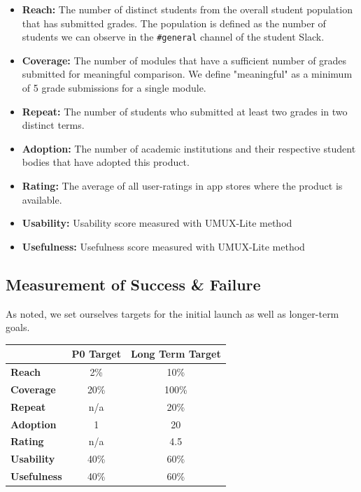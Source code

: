 \begin{itemize}
    \item \textbf{Reach:} The number of distinct students from the overall student population that has submitted grades. The population is defined as the number of students we can observe in the \texttt{\#general} channel of the student Slack. 
    \item \textbf{Coverage:} The number of modules that have a sufficient number of grades submitted for meaningful comparison. We define "meaningful" as a minimum of 5 grade submissions for a single module.
    \item \textbf{Repeat:} The number of students who submitted at least two grades in two distinct terms.
    \item \textbf{Adoption:} The number of academic institutions and their respective student bodies that have adopted this product.
   \item \textbf{Rating:} The average of all user-ratings in app stores where the product is available.
   \item \textbf{Usability:} Usability score measured with UMUX-Lite method
   \item \textbf{Usefulness:} Usefulness score measured with UMUX-Lite method
\end{itemize}

\subsection{Measurement of Success \& Failure}
As noted, we set ourselves targets for the initial launch as well as longer-term goals.

\begin{table}[H]
\centering
\begin{tabular}{@{}lcc@{}}
\toprule
                  & \multicolumn{1}{l}{\textbf{P0 Target}} & \multicolumn{1}{l}{\textbf{Long Term Target}} \\ \midrule
\textbf{Reach}    & 2\%                                   & 10\%                                         \\
\textbf{Coverage} & 20\%                                  & 100\%                                        \\
\textbf{Repeat}   & n/a                                   & 20\%                                         \\
\textbf{Adoption} & 1                                     & 20                                           \\
\textbf{Rating}   & n/a                                   & 4.5                                          \\ 
\textbf{Usability}   & 40\%                                   & 60\%                                          \\ 
\textbf{Usefulness}   & 40\%                                 & 60\%                                          \\ \bottomrule

\end{tabular}
\end{table}

